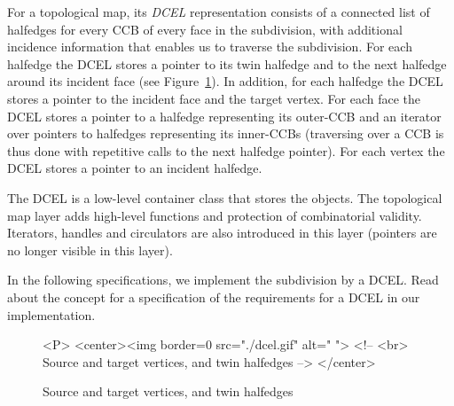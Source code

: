 For a topological map, its {\em DCEL} representation consists of a
connected list of halfedges for every CCB of every face in the
subdivision, with additional incidence information that enables us to
traverse the subdivision. %
For each halfedge the DCEL
stores a pointer to its twin halfedge and to the next
halfedge around its incident face (see Figure~\ref{fig:DCEL_ref}). In
addition, for each halfedge the DCEL stores a pointer to the incident
face and the target vertex.
For each face the DCEL stores a pointer to a halfedge representing
its outer-CCB and an iterator over pointers to halfedges representing
its inner-CCBs (traversing over a CCB is thus done with repetitive
calls to the next halfedge pointer).
For each vertex the DCEL stores a pointer to an incident halfedge. 

The DCEL is a low-level container class that stores the objects.
The topological map layer adds high-level functions and protection of
combinatorial validity. Iterators, handles and circulators are also
introduced in this layer (pointers are no longer visible in this layer).

In the following
specifications, we implement the subdivision by a DCEL. Read about the concept
for a specification of the requirements for a DCEL in our implementation.

\begin{figure}
\begin{ccTexOnly}
    \centerline{
       }
\end{ccTexOnly}
\caption{Source and target vertices, and twin halfedges \label{fig:DCEL_ref}}

\begin{ccHtmlOnly}
<P>
<center><img border=0 src="./dcel.gif" alt=" ">
<!-- <br> Source and target vertices, and twin halfedges -->
</center>
\end{ccHtmlOnly}
\end{figure}

